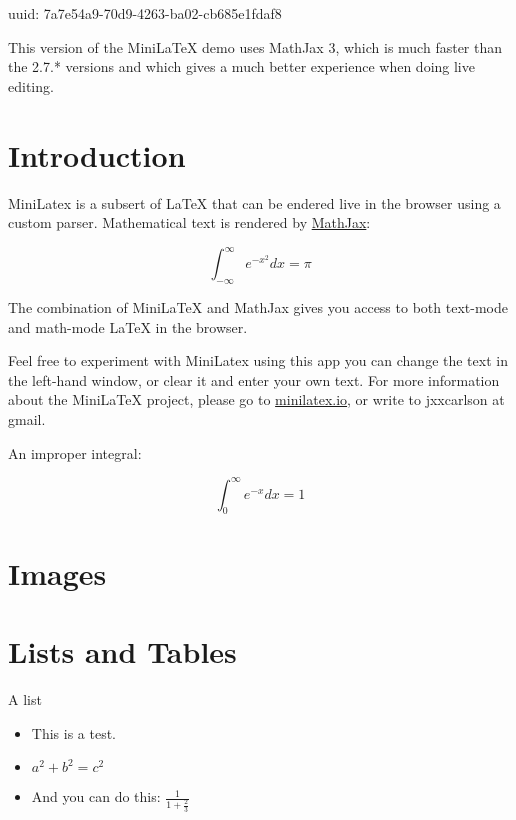 uuid: 7a7e54a9-70d9-4263-ba02-cb685e1fdaf8


 This version of the MiniLaTeX
demo uses MathJax 3, which is much faster than
the 2.7.* versions and which gives a much better
experience when doing live editing.

\section{Introduction}

MiniLatex is a subsert 
of LaTeX that can
be endered live in the browser using a custom parser.
Mathematical text is rendered by
 \href{https://mathjax.org}{MathJax}:

$$
\int_{-\infty}^\infty e^{-x^2} dx = \pi
$$

The combination of MiniLaTeX and MathJax
gives you access to both text-mode
and math-mode LaTeX in the browser.


Feel free to
experiment with MiniLatex using this app
\mdash you can change the text in the
left-hand window, or clear it and enter
your own text. For more information about
the MiniLaTeX project, please go to
\href{https://minilatex.io}{minilatex.io},
or write to jxxcarlson at gmail.


An improper integral:

\begin{equation}
\label{integral:exp}
\int_0^\infty e^{-x} dx = 1
\end{equation}


\section{Images}


\section{Lists and Tables}

A list

\begin{itemize}

\item This is  a test.

\item {} $a^2 + b^2 = c^2$

\item And you can do this:
$ \frac{1}{1 + \frac{2}{3}} $

\end{itemize}


